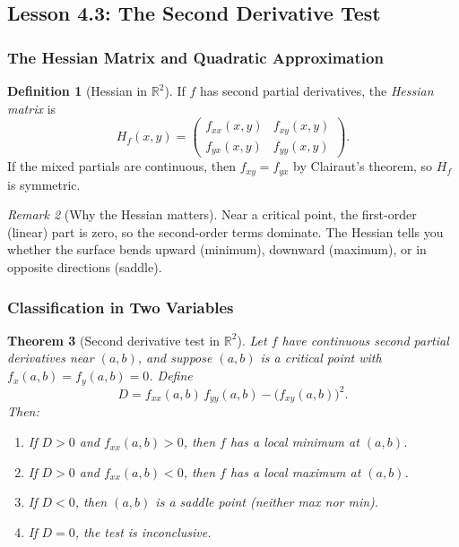 \documentclass[12pt]{article}
\numberwithin{equation}{section}
\newcommand{\RR}{\mathbb{R}}
\theoremstyle{plain}
\newtheorem{theorem}{Theorem}[section]
\theoremstyle{definition}
\newtheorem{definition}[theorem]{Definition}
\theoremstyle{remark}
\newtheorem{remark}[theorem]{Remark}
\begin{document}
\subsection{Lesson 4.3: The Second Derivative Test}

\subsubsection{The Hessian Matrix and Quadratic Approximation}

\begin{definition}[Hessian in $\RR^2$]\label{def:hessian}
If $f$ has second partial derivatives, the \emph{Hessian matrix} is
\[
H_f(x,y)=
\begin{pmatrix}
f_{xx}(x,y) & f_{xy}(x,y)\\
f_{yx}(x,y) & f_{yy}(x,y)
\end{pmatrix}.
\]
If the mixed partials are continuous, then $f_{xy}=f_{yx}$ by Clairaut's theorem, so $H_f$ is symmetric.
\end{definition}

\begin{remark}[Why the Hessian matters]
Near a critical point, the first-order (linear) part is zero, so the second-order terms dominate.  
The Hessian tells you whether the surface bends upward (minimum), downward (maximum), or in opposite directions (saddle).
\end{remark}

\subsubsection{Classification in Two Variables}

\begin{theorem}[Second derivative test in $\RR^2$]\label{thm:second-derivative-test}
Let $f$ have continuous second partial derivatives near $(a,b)$, and suppose $(a,b)$ is a critical point with $f_x(a,b)=f_y(a,b)=0$. Define
\begin{equation}\label{eq:D}
D = f_{xx}(a,b)\,f_{yy}(a,b) - \big(f_{xy}(a,b)\big)^2.
\end{equation}
Then:
\begin{enumerate}[label=(\alph*)]
\item If $D>0$ and $f_{xx}(a,b)>0$, then $f$ has a \emph{local minimum} at $(a,b)$.
\item If $D>0$ and $f_{xx}(a,b)<0$, then $f$ has a \emph{local maximum} at $(a,b)$.
\item If $D<0$, then $(a,b)$ is a \emph{saddle point} (neither max nor min).
\item If $D=0$, the test is \emph{inconclusive}.
\end{enumerate}
\end{theorem}
\end{document}
